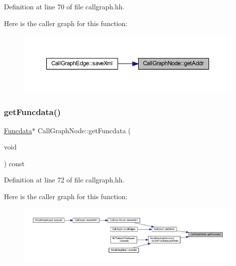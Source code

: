 Definition at line 70 of file callgraph.\+hh.

Here is the caller graph for this function\+:
\nopagebreak
\begin{figure}[H]
\begin{center}
\leavevmode
\includegraphics[width=350pt]{class_call_graph_node_a8b884b92324abe22eb8c2442c027b660_icgraph}
\end{center}
\end{figure}
\mbox{\label{class_call_graph_node_af0cc63edc8f21a1fc4abe1d64fd1d17f}} 
\subsubsection{\texorpdfstring{getFuncdata()}{getFuncdata()}}
{\footnotesize\ttfamily \mbox{\hyperlink{class_funcdata}{Funcdata}}$\ast$ Call\+Graph\+Node\+::get\+Funcdata (\begin{DoxyParamCaption}\item[{void}]{ }\end{DoxyParamCaption}) const\hspace{0.3cm}{\ttfamily [inline]}}



Definition at line 72 of file callgraph.\+hh.

Here is the caller graph for this function\+:
\nopagebreak
\begin{figure}[H]
\begin{center}
\leavevmode
\includegraphics[width=350pt]{class_call_graph_node_af0cc63edc8f21a1fc4abe1d64fd1d17f_icgraph}
\end{center}
\end{figure}
\mbox{\label{class_call_graph_node_a74c8585fd8fb11a824646c42d7abf3a6}} 
